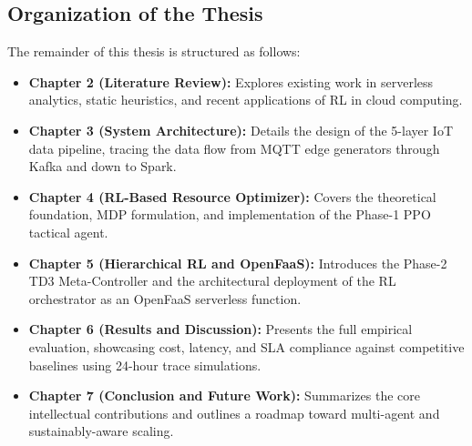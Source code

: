 \subsection{Organization of the Thesis}

The remainder of this thesis is structured as follows:
\begin{itemize}
    \item \textbf{Chapter 2 (Literature Review):} Explores existing work in serverless analytics, static heuristics, and recent applications of RL in cloud computing.
    \item \textbf{Chapter 3 (System Architecture):} Details the design of the 5-layer IoT data pipeline, tracing the data flow from MQTT edge generators through Kafka and down to Spark.
    \item \textbf{Chapter 4 (RL-Based Resource Optimizer):} Covers the theoretical foundation, MDP formulation, and implementation of the Phase-1 PPO tactical agent.
    \item \textbf{Chapter 5 (Hierarchical RL and OpenFaaS):} Introduces the Phase-2 TD3 Meta-Controller and the architectural deployment of the RL orchestrator as an OpenFaaS serverless function.
    \item \textbf{Chapter 6 (Results and Discussion):} Presents the full empirical evaluation, showcasing cost, latency, and SLA compliance against competitive baselines using 24-hour trace simulations.
    \item \textbf{Chapter 7 (Conclusion and Future Work):} Summarizes the core intellectual contributions and outlines a roadmap toward multi-agent and sustainably-aware scaling.
\end{itemize}
